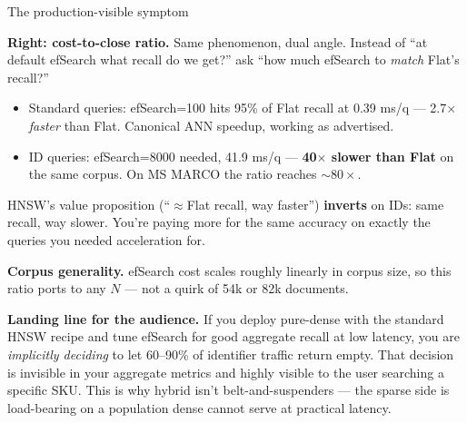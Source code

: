 \begin{frame}{The production-visible symptom}
{  \textbf{Right: cost-to-close ratio.} Same phenomenon, dual angle.
  Instead of ``at default efSearch what recall do we get?'' ask ``how
  much efSearch to \emph{match} Flat's recall?''
  \begin{itemize}
    \item Standard queries: efSearch=100 hits 95\% of Flat recall at
          0.39 ms/q --- 2.7$\times$ \emph{faster} than Flat. Canonical ANN
          speedup, working as advertised.
    \item ID queries: efSearch=8000 needed, 41.9 ms/q --- \textbf{40$\times$
          slower than Flat} on the same corpus. On MS MARCO the ratio
          reaches $\sim 80\times$.
  \end{itemize}
  HNSW's value proposition (``$\approx$Flat recall, way faster'')
  \textbf{inverts} on IDs: same recall, way slower. You're paying more
  for the same accuracy on exactly the queries you needed acceleration for.

  \textbf{Corpus generality.} efSearch cost scales roughly linearly in
  corpus size, so this ratio ports to any $N$ --- not a quirk of 54k or 82k
  documents.

  \textbf{Landing line for the audience.} If you deploy pure-dense with
  the standard HNSW recipe and tune efSearch for good aggregate recall
  at low latency, you are \emph{implicitly deciding} to let 60--90\% of
  identifier traffic return empty. That decision is invisible in your
  aggregate metrics and highly visible to the user searching a specific
  SKU. This is why hybrid isn't belt-and-suspenders --- the sparse side
  is load-bearing on a population dense cannot serve at practical latency.
  }
\end{frame}

